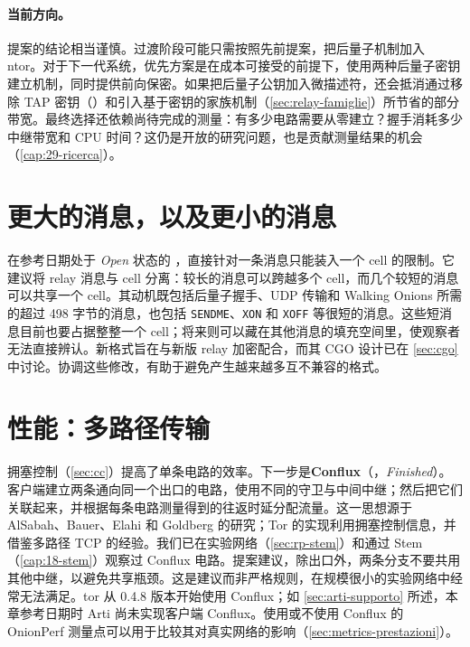 \paragraph{当前方向。}提案的结论相当谨慎。过渡阶段可能只需按照先前提案，把后量子机制加入 ntor。对于下一代系统，优先方案是在成本可接受的前提下，使用两种后量子密钥建立机制，同时提供前向保密。如果把后量子公钥加入微描述符，还会抵消通过移除 TAP 密钥（）和引入基于密钥的家族机制（\cref{sec:relay-famiglie}）所节省的部分带宽。最终选择还依赖尚待完成的测量：有多少电路需要从零建立？握手消耗多少中继带宽和 CPU 时间？这仍是开放的研究问题，也是贡献测量结果的机会（\cref{cap:29-ricerca}）。

\section{更大的消息，以及更小的消息}\label{sec:fut-340}

在参考日期处于 \emph{Open} 状态的 ，直接针对一条消息只能装入一个 cell 的限制。它建议将 relay 消息与 cell 分离：较长的消息可以跨越多个 cell，而几个较短的消息可以共享一个 cell。其动机既包括后量子握手、UDP 传输和 Walking Onions 所需的超过 498 字节的消息，也包括 \texttt{SENDME}、\texttt{XON} 和 \texttt{XOFF} 等很短的消息。这些短消息目前也要占据整整一个 cell；将来则可以藏在其他消息的填充空间里，使观察者无法直接辨认。新格式旨在与新版 relay 加密配合，而其 CGO 设计已在 \cref{sec:cgo} 中讨论。协调这些修改，有助于避免产生越来越多互不兼容的格式。

\section{性能：多路径传输}\label{sec:fut-conflux}

拥塞控制（\cref{sec:cc}）提高了单条电路的效率。下一步是\textbf{Conflux}（，\emph{Finished}）。客户端建立两条通向同一个出口的电路，使用不同的守卫与中间中继；然后把它们关联起来，并根据每条电路测量得到的往返时延分配流量。这一思想源于 AlSabah、Bauer、Elahi 和 Goldberg 的研究；Tor 的实现利用拥塞控制信息，并借鉴多路径 TCP 的经验。我们已在实验网络（\cref{sec:rp-stem}）和通过 Stem（\cref{cap:18-stem}）观察过 Conflux 电路。提案建议，除出口外，两条分支不要共用其他中继，以避免共享瓶颈。这是建议而非严格规则，在规模很小的实验网络中经常无法满足。tor 从 0.4.8 版本开始使用 Conflux；如 \cref{sec:arti-supporto} 所述，本章参考日期时 Arti 尚未实现客户端 Conflux。使用或不使用 Conflux 的 OnionPerf 测量点可以用于比较其对真实网络的影响（\cref{sec:metrics-prestazioni}）。

